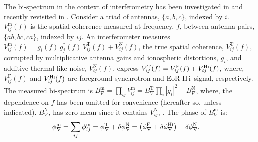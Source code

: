 \documentclass[
reprint,
superscriptaddress,
amsmath,
amssymb,
aps,
prd
]{revtex4-1}
\newcommand{\HI}{H\,{\sc i}}
\begin{document}
The bi-spectrum in the context of interferometry has been investigated in \cite{jen58,kul89,tay99,tho01,mon06} and recently revisited in \cite{car18}. Consider a triad of antennas, $\{a, b, c\}$, indexed by $i$. $V_{ij}^\textrm{m}(f)$ is the spatial coherence measured at frequency, $f$, between antenna pairs, $\{ab, bc, ca\}$, indexed by $ij$. An interferometer measures $V_{ij}^\textrm{m}(f) = g_i(f)\, g_j^*(f)\, V_{ij}^\textrm{T}(f) + V_{ij}^\textrm{N}(f)$, the  true spatial coherence, $V_{ij}^\textrm{T}(f)$, corrupted by multiplicative antenna gains and ionospheric distortions, $g_i$, and additive thermal-like noise, $V_{ij}^\textrm{N}(f)$.  express $V_{ij}^\textrm{T}(f) = V_{ij}^\textrm{F}(f) + V_{ij}^\textrm{H{\sc i}}(f)$, where, $V_{ij}^\textrm{F}(f)$ and $V_{ij}^\textrm{H{\sc i}}(f)$ are  foreground synchrotron and EoR \HI\ signal, respectively. The measured bi-spectrum is $B_\nabla^\textrm{m}=\prod_{ij} V_{ij}^\textrm{m}=B_\nabla^\textrm{T}\prod_i |g_i|^2+B_\nabla^\textrm{N}$, where, the dependence on $f$ has been omitted for convenience (hereafter so, unless indicated).   $B_\nabla^\textrm{N}$,  has zero mean since it contains $V_{ij}^\textrm{N}$, . The phase of $B_\nabla^\textrm{m}$ is:
\begin{align}
  \phi_\nabla^\textrm{m} &= \sum_{ij}\phi_{ij}^\textrm{m} = \phi_\nabla^\textrm{T} + \delta\phi_\nabla^\textrm{N} = \left(\phi_\nabla^\textrm{F} + \delta\phi_\nabla^\textrm{H{\sc i}}\right) + \delta\phi_\nabla^\textrm{N} \label{eqn:cpphase-sum},
\end{align}
\end{document}
